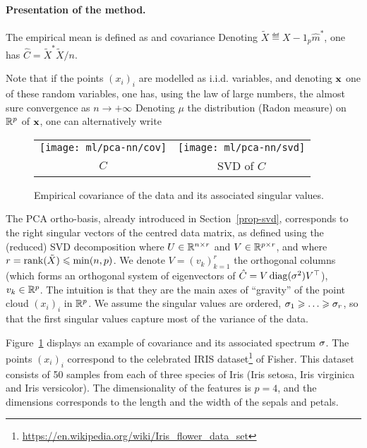 \paragraph{Presentation of the method.}

The empirical mean is defined as 
and  covariance
Denoting $\tilde X \eqdef X - 1_p \hat m^*$, one has $\hat C=\tilde X^*
\tilde X/n$. 

Note that if the points $(x_i)_i$ are modelled as i.i.d. variables, and denoting $\mathrm{\bf x}$ one of these random variables, one has, using the law of large numbers, the almost sure convergence as $n \rightarrow +\infty$
Denoting $\mu$ the distribution (Radon measure) on $\mathbb{R}^p$ of $\mathrm{\bf x}$, one can alternatively write


\begin{figure}
\centering
\begin{tabular}{@{}c@{}c@{}}
\texttt{[image: ml/pca-nn/cov]}&
\texttt{[image: ml/pca-nn/svd]}\\
$C$ & SVD of $C$
\end{tabular}
\caption{\label{fig-cov}
Empirical covariance of the data and its associated singular values. 
}
\end{figure}


The PCA ortho-basis, already introduced in Section~\ref{prop-svd}, corresponds to the right singular vectors of the centred data matrix, as defined using the (reduced) SVD decomposition
where $U \in \mathbb{R}^{n \times r}$ and $V \in \mathbb{R}^{p \times r}$, and where $r=\operatorname{rank}(\tilde X) \leqslant \min(n,p)$. 
%
We denote $V=(v_k)_{k=1}^r$ the orthogonal columns (which forms an orthogonal system of eigenvectors of $\hat C = V \operatorname{diag}(\sigma^2) V^\top$), $v_k \in \mathbb{R}^p$. The intuition is that they are the main axes of ``gravity'' of the point cloud  $(x_i)_i$ in $\mathbb{R}^p$.
%
We assume the singular values are ordered, $\sigma_1 \geqslant \ldots \geqslant \sigma_r$, so that the first singular values capture most of the variance of the data. 

Figure~\ref{fig-cov} displays an example of covariance and its associated spectrum $\sigma$. The points $(x_i)_i$ correspond to the celebrated
IRIS dataset\footnote{\url{https://en.wikipedia.org/wiki/Iris_flower_data_set}} of Fisher. This dataset consists of 50 samples from each of three species of Iris (Iris setosa, Iris virginica and Iris versicolor). The dimensionality of the features is $p=4$, and the dimensions corresponds to the length and the width of the sepals and petals. 

